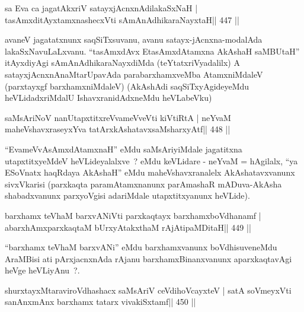 \begin{shl}
sa Eva ca jagatAkxriV satayxjAcnxnAdilakaSxNaH |
tasAmxditAyxtamxnashecxVti sAmAnAdhikaraNayxtaH\hfill || 447 ||
\end{shl}

\begin{artha}
avaneV jagatatxnunx saqSiTxsuvanu, avanu satayx-jAcnxna-modalAda
lakaSxNavuLaLxvanu. ``tasAmxdAvx EtasAmxdAtamxna AkAshaH saMBUtaH''
itAyxdiyAgi sAmAnAdhikaraNayxdiMda (teYtatxriVyadalilx) A
satayxjAcnxnAnaMtarUpavAda parabarxhamxveMba AtamxniMdaleV (parxtayxgf
barxhamxniMdaleV) (AkAshAdi saqSiTxyAgideyeMdu heVLidadxriMdalU
IshavxranidAdxneMdu heVLabeVku)
\end{artha}




\begin{shl}
saMsAriNoV nanUtapxtitxreVvameVveVti kiVtiRtA |
neYvaM maheVshavxraseyxYva tatArx\s\s kAshatavxsaMsharxyAtf\hfill || 448 ||
\end{shl}

\begin{artha}
``EvameVvAsAmxdAtamxnaH'' eMdu saMsAriyiMdale jagatitxna   utapxtitxyeMdeV heVLideyalalxve~? eMdu keVLidare - neYvaM =   hAgilalx, ``ya ESoV\s natx haqRdaya AkAshaH'' eMdu   maheVshavxranalelx AkAshatavxvanunx sivxVkarisi (parxkaqta   paramAtamxnanunx parAmashaR mADuva-AkAsha shabadxvanunx parxyoVgisi   adariMdale utapxtitxyanunx heVLide).
\end{artha}



\begin{shl}
barxhamx teV\s haM barxvANiVti parxkaqtayx barxhamxboVdhanamf |
abarxhAmxparxkaqtaM bUrxyAtakxthaM rAjA\s tipaMDitaH\hfill || 449 ||
\end{shl}

\begin{artha}
``barxhamx teV\s haM barxvANi'' eMdu barxhamxvanunx boVdhisuveneMdu   AraMBisi ati pArxjacnxnAda rAjanu barxhamxBinanxvanunx   aparxkaqtavAgi heVge heVLiyAnu~?.
\end{artha}

\begin{shl}
shurxtayxMtaraviroVdhashacx saMsAriV ceVdihoVcayxteV |
satA soVmeyxVti sanAnxmAnx barxhamx tatarx vivakiSxtamf\hfill || 450 ||
\end{shl}

